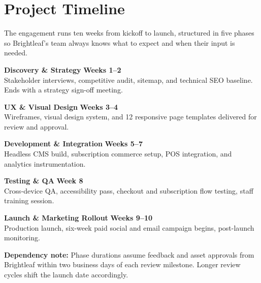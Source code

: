 \section{Project Timeline}

The engagement runs ten weeks from kickoff to launch, structured in five phases so Brightleaf's
team always knows what to expect and when their input is needed.

\begin{timeline}
  \item \textbf{\color{accent}Discovery \& Strategy} \hfill {\color{accent2}\textbf{Weeks 1--2}}\\[2pt]
        \small\color{softgray} Stakeholder interviews, competitive audit, sitemap, and technical
        SEO baseline. Ends with a strategy sign-off meeting.

  \item \textbf{\color{accent}UX \& Visual Design} \hfill {\color{accent2}\textbf{Weeks 3--4}}\\[2pt]
        \small\color{softgray} Wireframes, visual design system, and 12 responsive page templates
        delivered for review and approval.

  \item \textbf{\color{accent}Development \& Integration} \hfill {\color{accent2}\textbf{Weeks 5--7}}\\[2pt]
        \small\color{softgray} Headless CMS build, subscription commerce setup, POS integration,
        and analytics instrumentation.

  \item \textbf{\color{accent}Testing \& QA} \hfill {\color{accent2}\textbf{Week 8}}\\[2pt]
        \small\color{softgray} Cross-device QA, accessibility pass, checkout and subscription flow
        testing, staff training session.

  \item \textbf{\color{accent}Launch \& Marketing Rollout} \hfill {\color{accent2}\textbf{Weeks 9--10}}\\[2pt]
        \small\color{softgray} Production launch, six-week paid social and email campaign begins,
        post-launch monitoring.
\end{timeline}

\vspace{0.8em}
\begin{tcolorbox}[noteboxstyle]
  \textbf{\color{accent}Dependency note:} Phase durations assume feedback and asset approvals
  from Brightleaf within two business days of each review milestone. Longer review cycles shift
  the launch date accordingly.
\end{tcolorbox}

\clearpage

